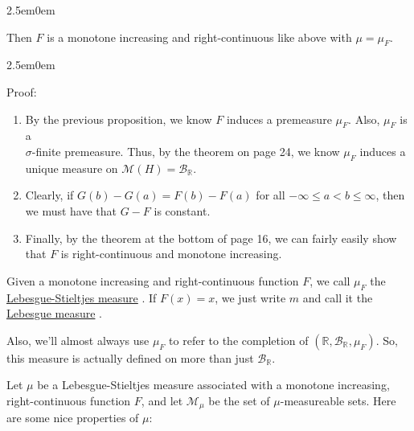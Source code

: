 \documentclass{book}
\newcommand{\hThree}{%
   \color{PineGreen!85!Orange}
   \fontsize{12}{14}\selectfont%
}
\newenvironment{myIndent}{%
   \begin{adjustwidth}{2.5em}{0em}%
}{%
   \end{adjustwidth}%
}
\newcommand{\udefine}[1]{{%
   \setulcolor{Red}%
   \setul{0.14em}{0.07em}%
   \ul{#1}%
}}
\newcommand{\retTwo}{\hfill\bigbreak}
\begin{document}
\begin{myIndent}
\begin{enumerate}
      Then $F$ is a monotone increasing and right-continuous like above with $\mu = \mu_F$.
   \end{enumerate}
   
   \begin{myIndent}\hThree
      Proof:
      \begin{enumerate}
         \item By the previous proposition, we know $F$ induces a premeasure $\mu_F$. Also, $\mu_F$ is a\\ $\sigma$-finite premeasure. Thus, by the theorem on page 24, we know $\mu_F$ induces a unique measure on $\mathcal{M}(H) = \mathcal{B}_{\mathbb{R}}$.\retTwo
   
         \item Clearly, if $G(b) - G(a) = F(b) - F(a)$ for all $-\infty \leq a < b \leq \infty$, then we must have that $G - F$ is constant.\retTwo
   
         \item Finally, by the theorem at the bottom of page 16, we can fairly easily show that $F$ is right-continuous and monotone increasing.\newpage
      \end{enumerate}
   \end{myIndent}
\end{myIndent}

Given a monotone increasing and right-continuous function $F$, we call $\mu_F$ the\\ \udefine{Lebesgue-Stieltjes measure}. If $F(x) = x$, we just write $m$ and call it the\\ \udefine{Lebesgue measure}.\retTwo

Also, we'll almost always use $\mu_F$ to refer to the completion of $(\mathbb{R}, \mathcal{B}_{\mathbb{R}}, \mu_F)$. So, this measure is actually defined on more than just $\mathcal{B}_{\mathbb{R}}$.\retTwo

Let $\mu$ be a Lebesgue-Stieltjes measure associated with a monotone increasing, right-continuous function $F$, and let $\mathcal{M}_{\mu}$ be the set of $\mu$-measureable sets. Here are some nice properties of $\mu$:
\end{document}
